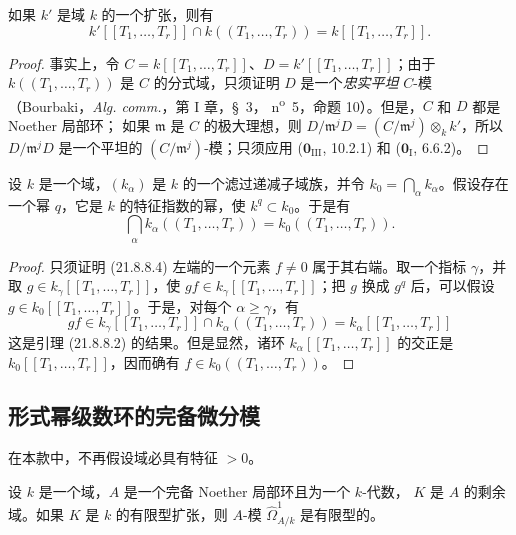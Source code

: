 \begin{lemma}[21.8.8.2]
\label{0.21.8.8.2-fr}
如果 $k'$ 是域 $k$ 的一个扩张，则有
\[
  k'[[T_1,\ldots,T_r]]\cap k((T_1,\ldots,T_r))=k[[T_1,\ldots,T_r]].
\]
\end{lemma}

\begin{proof}
事实上，令 $C=k[[T_1,\ldots,T_r]]$、$D=k'[[T_1,\ldots,T_r]]$；由于
$k((T_1,\ldots,T_r))$ 是 $C$ 的分式域，只须证明 $D$ 是一个\emph{忠实平坦}
$C$-模（Bourbaki，\emph{Alg. comm.}，第 I 章，\S~3，
n\textsuperscript{o}~5，命题 10）。但是，$C$ 和 $D$ 都是 Noether 局部环；
如果 $\mathfrak m$ 是 $C$ 的极大理想，则
$D/\mathfrak m^jD=(C/\mathfrak m^j)\otimes_k k'$，所以
$D/\mathfrak m^jD$ 是一个平坦的 $(C/\mathfrak m^j)$-模；只须应用
($\mathbf 0_{\mathrm{III}}$, 10.2.1) 和
($\mathbf 0_{\mathrm I}$, 6.6.2)。
\end{proof}

\begin{lemma}[21.8.8.3]
\label{0.21.8.8.3-fr}
设 $k$ 是一个域，$(k_\alpha)$ 是 $k$ 的一个滤过递减子域族，并令
$k_0=\bigcap_\alpha k_\alpha$。假设存在一个幂 $q$，它是 $k$ 的特征指数的幂，使
$k^q\subset k_0$。于是有
\begin{equation}
\tag{21.8.8.4}
\label{0.21.8.8.4-fr}
  \bigcap_\alpha k_\alpha((T_1,\ldots,T_r))=k_0((T_1,\ldots,T_r)).
\end{equation}
\end{lemma}

\begin{proof}
只须证明 (21.8.8.4) 左端的一个元素 $f\ne0$ 属于其右端。取一个指标
$\gamma$，并取 $g\in k_\gamma[[T_1,\ldots,T_r]]$，使
$gf\in k_\gamma[[T_1,\ldots,T_r]]$；把 $g$ 换成 $g^q$ 后，可以假设
$g\in k_0[[T_1,\ldots,T_r]]$。于是，对每个 $\alpha\geqslant\gamma$，有
\[
  gf\in k_\gamma[[T_1,\ldots,T_r]]\cap k_\alpha((T_1,\ldots,T_r))
  =k_\alpha[[T_1,\ldots,T_r]]
\]
这是引理 (21.8.8.2) 的结果。但是显然，诸环
$k_\alpha[[T_1,\ldots,T_r]]$ 的交正是 $k_0[[T_1,\ldots,T_r]]$，因而确有
$f\in k_0((T_1,\ldots,T_r))$。
\end{proof}

\subsection{形式幂级数环的完备微分模}
\label{subsection:0.21.9-fr}

在本款中，不再假设域必具有特征 $>0$。

\begin{lemma}[21.9.1]
\label{0.21.9.1-fr}
设 $k$ 是一个域，$A$ 是一个完备 Noether 局部环且为一个 $k$-代数，
$K$ 是 $A$ 的剩余域。如果 $K$ 是 $k$ 的有限型扩张，则 $A$-模
$\widehat\Omega^1_{A/k}$ 是有限型的。
\end{lemma}

